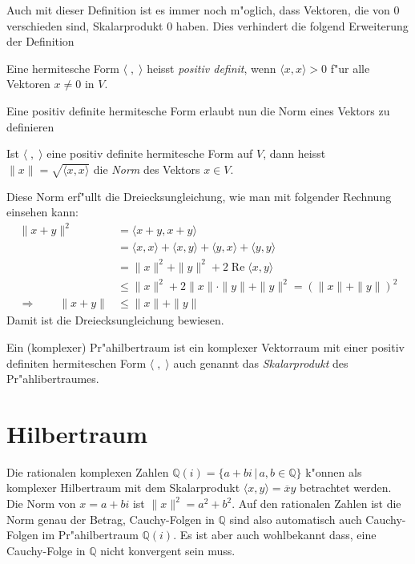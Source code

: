 Auch mit dieser Definition ist es immer noch m"oglich, dass Vektoren,
die von $0$ verschieden sind, Skalarprodukt $0$ haben.
Dies verhindert die folgend Erweiterung der Definition

\begin{definition}
\label{hilbert:postivdefiniteform}
Eine hermitesche Form $\langle\;,\;\rangle$ heisst {\em positiv definit},
wenn $\langle x,x\rangle > 0$ f"ur alle Vektoren $x\ne 0$ in $V$.
\end{definition}

Eine positiv definite hermitesche Form erlaubt nun die Norm
eines Vektors zu definieren

\begin{definition}
Ist $\langle \;,\;\rangle$ eine positiv definite hermitesche Form
auf $V$, dann heisst $\|x\| = \sqrt{\langle x,x\rangle}$ die {\em Norm}
des Vektors $x\in V$.
\end{definition}

Diese Norm erf"ullt die Dreiecksungleichung, wie man mit folgender
Rechnung einsehen kann:
\begin{align*}
\|x+y\|^2
&=
\langle x+y,x+y\rangle
\\
&=
\langle x,x\rangle
+
\langle x,y\rangle
+
\langle y,x\rangle
+
\langle y,y\rangle
\\
&=
\|x\|^2 + \|y\|^2
+ 2\operatorname{Re}\langle x,y\rangle
\\
&\le
\|x\|^2 + 2\|x\|\cdot \|y\| + \|y\|^2 = (\|x\| + \|y\|)^2
\\
\Rightarrow\qquad
\|x+y\|
&\le
\|x\| + \|y\|
\end{align*}
Damit ist die Dreiecksungleichung bewiesen.

\begin{definition}
Ein (komplexer) Pr"ahilbertraum ist ein komplexer Vektorraum mit
einer positiv definiten hermiteschen Form $\langle\;,\;\rangle$
auch genannt das {\em Skalarprodukt} des Pr"ahlibertraumes.
\end{definition}

\section{Hilbertraum}
Die rationalen komplexen Zahlen $\mathbb Q(i)=\{a+bi\,|\,a,b\in\mathbb Q\}$
k"onnen als komplexer Hilbertraum mit dem Skalarprodukt
$\langle x,y\rangle = \overline{x}y$ betrachtet werden.
Die Norm von $x=a+bi$ ist $\|x\|^2=a^2+b^2$.
Auf den rationalen Zahlen ist die Norm genau der Betrag, Cauchy-Folgen
in $\mathbb Q$ sind also automatisch auch Cauchy-Folgen im
Pr"ahilbertraum $\mathbb Q(i)$.
Es ist aber auch wohlbekannt dass, eine Cauchy-Folge in $\mathbb Q$
nicht konvergent sein muss.

